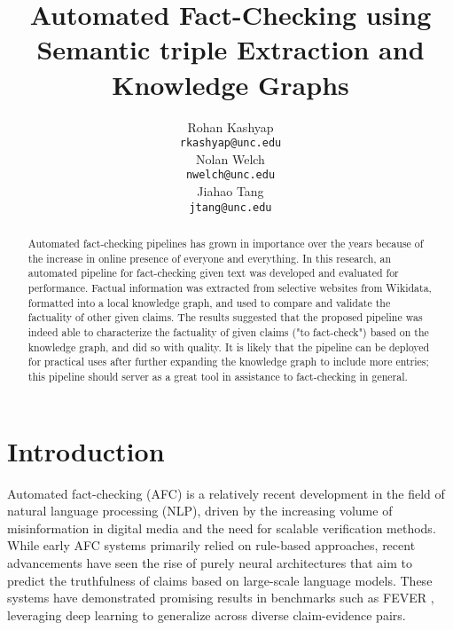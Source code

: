 \documentclass[11pt]{article}
\title{Automated Fact-Checking using Semantic triple Extraction and Knowledge Graphs}
\author{
  Rohan Kashyap \\
  \texttt{rkashyap@unc.edu} \\\And
  Nolan Welch \\
  \texttt{nwelch@unc.edu} \\\And
  Jiahao Tang \\
  \texttt{jtang@unc.edu}
}
\begin{document}
\maketitle
\begin{abstract}
Automated fact-checking pipelines has grown in importance over the years because of the increase in online presence of everyone and everything. In this research, an automated pipeline for fact-checking given text was developed and evaluated for performance. Factual information was extracted from selective websites from Wikidata, formatted into a local knowledge graph, and used to compare and validate the factuality of other given claims. The results suggested that the proposed pipeline was indeed able to characterize the factuality of given claims ("to fact-check") based on the knowledge graph, and did so with quality. It is likely that the pipeline can be deployed for practical uses after further expanding the knowledge graph to include more entries; this pipeline should server as a great tool in assistance to fact-checking in general. 
\end{abstract}

\section{Introduction}
Automated fact-checking (AFC) is a relatively recent development in the field of natural language processing (NLP), driven by the increasing volume of misinformation in digital media and the need for scalable verification methods. While early AFC systems primarily relied on rule-based approaches, recent advancements have seen the rise of purely neural architectures that aim to predict the truthfulness of claims based on large-scale language models. These systems have demonstrated promising results in benchmarks such as FEVER \cite{fever}, leveraging deep learning to generalize across diverse claim-evidence pairs.
\end{document}
